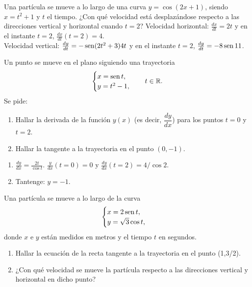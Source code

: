 
{Una partícula se mueve a lo largo de una curva $y=\cos(2x+1)$, siendo $x=t^2+1$ y $t$ el tiempo. ¿Con qué velocidad está desplazándose respecto a las direcciones vertical y horizontal cuando $t=2$?
}
{Velocidad horizontal: $\frac{dx}{dt} = 2t$ y en el instante $t=2$, $\frac{dx}{dt}(t=2)=4$.\\
Velocidad vertical: $\frac{dy}{dt}=-\operatorname{sen}(2t^2+3)4t$ y en el instante $t=2$, $\frac{dy}{dt}=-8\operatorname{sen} 11$.
}
{
}


{Un punto se mueve en el plano siguiendo una trayectoria
\[
\begin{cases}
x= \operatorname{sen} t,\\
y = t^2-1,
\end{cases}
\quad t\in \mathbb{R}.
\]
Se pide:
\begin{enumerate}
\item  Hallar la derivada de la función $y(x)$ (es decir, $\dfrac{dy}{dx}$) para los puntos $t=0$ y $t=2$.
\item  Hallar la tangente a la trayectoria en el punto $(0,-1)$.
\end{enumerate}
}
{\begin{enumerate}
\item $\frac{dy}{dx} = \frac{2t}{\cos t}$. $\frac{y}{dx}(t=0) = 0$ y $\frac{dy}{dx}(t=2) = 4/\cos 2$.
\item Tantenge: $y=-1$.
\end{enumerate}
}
{
}


{Una partícula se mueve a lo largo de la curva
\[
\begin{cases}
x=2\operatorname{sen} t, \\
y=\sqrt{3}\cos t,
\end{cases}
\]
donde $x$ e $y$ están medidos en metros y el tiempo $t$ en
segundos.
\begin{enumerate}
\item  Hallar la ecuación de la recta tangente a la trayectoria en el punto (1,3/2).
\item  ¿Con qué velocidad se mueve la partícula respecto a las direcciones vertical y horizontal en dicho punto?
\end{enumerate}
}


